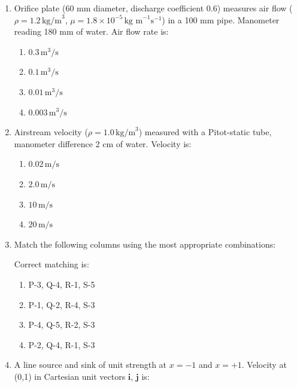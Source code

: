 \documentclass[journal,cmex10]{IEEEtran}
\theoremstyle{remark}
\numberwithin{equation}{enumi}
\numberwithin{figure}{enumi}
\begin{document}
\begin{enumerate}[label=\arabic*)]
\vspace{0.5cm}
\item Orifice plate (60 mm diameter, discharge coefficient 0.6) measures air flow ($\rho = 1.2\,\text{kg/m}^3$, $\mu=1.8 \times 10^{-5}\,\text{kg m}^{-1}\text{s}^{-1}$) in a 100 mm pipe. Manometer reading 180 mm of water. Air flow rate is:  
\hfill{}

\begin{enumerate}[label=\alph*)]
    \item $0.3\,\text{m}^3/\text{s}$
    \item $0.1\,\text{m}^3/\text{s}$
    \item $0.01\,\text{m}^3/\text{s}$
    \item $0.003\,\text{m}^3/\text{s}$
\end{enumerate}

\vspace{0.5cm}
\item Airstream velocity ($\rho=1.0\,\text{kg/m}^3$) measured with a Pitot-static tube, manometer difference 2 cm of water. Velocity is:  
\hfill{}

\begin{enumerate}[label=\alph*)]
    \item $0.02\,\text{m/s}$
    \item $2.0\,\text{m/s}$
    \item $10\,\text{m/s}$
    \item $20\,\text{m/s}$
\end{enumerate}

\vspace{0.5cm}
\item Match the following columns using the most appropriate combinations:  



\vspace{0.3cm}

Correct matching is:  
\bigskip
\hfill{}
\begin{enumerate}[label=\alph*)]
    \item P-3, Q-4, R-1, S-5
    \item P-1, Q-2, R-4, S-3
    \item P-4, Q-5, R-2, S-3
    \item P-2, Q-4, R-1, S-3
\end{enumerate}

\vspace{0.5cm}
\item A line source and sink of unit strength at $x=-1$ and $x=+1$. Velocity at (0,1) in Cartesian unit vectors $\mathbf{i}$, $\mathbf{j}$ is:  
\hfill{}


\end{enumerate}
\end{document}
